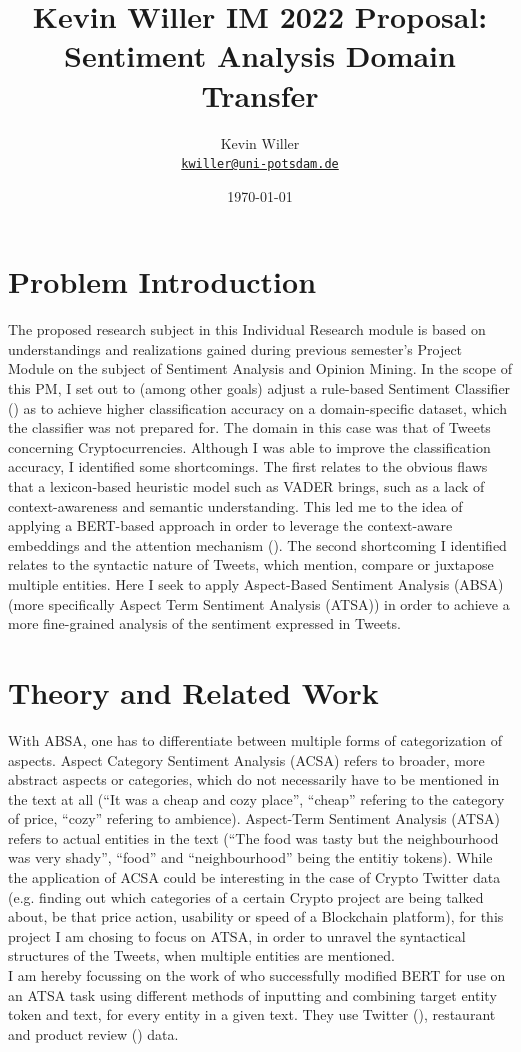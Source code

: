 \documentclass[11pt]{article}
\title{Kevin Willer IM 2022 Proposal: Sentiment Analysis Domain Transfer}
\author{Kevin Willer\\%
    \href{mailto:kwiller@uni-potsdam.de}{\texttt{kwiller@uni-potsdam.de}} %
    }
\date{\today}
\begin{document}
\maketitle

\section{Problem Introduction}
The proposed research subject in this Individual Research module is based on understandings and realizations gained during previous semester's Project Module on the subject of Sentiment Analysis and Opinion Mining. In the scope of this PM, I set out to (among other goals) adjust a rule-based Sentiment Classifier (\cite{vader}) as to achieve higher classification accuracy on a domain-specific dataset, which the classifier was not prepared for. The domain in this case was that of Tweets concerning Cryptocurrencies. Although I was able to improve the classification accuracy, I identified some shortcomings. The first relates to the obvious flaws that a lexicon-based heuristic model such as VADER brings, such as a lack of context-awareness and semantic understanding. This led me to the idea of applying a BERT-based approach in order to leverage the context-aware embeddings and the attention mechanism (\cite{bert}).
The second shortcoming I identified relates to the syntactic nature of Tweets, which mention, compare or juxtapose multiple entities. Here I seek to apply Aspect-Based Sentiment Analysis (ABSA) (more specifically Aspect Term Sentiment Analysis (ATSA)) in order to achieve a more fine-grained analysis of the sentiment expressed in Tweets.

\section{Theory and Related Work}
With ABSA, one has to differentiate between multiple forms of categorization of aspects. Aspect Category Sentiment Analysis (ACSA) refers to broader, more abstract aspects or categories, which do not necessarily have to be mentioned in the text at all (``It was a cheap and cozy place'', ``cheap'' refering to the category of price, ``cozy'' refering to ambience). Aspect-Term Sentiment Analysis (ATSA) refers to actual entities in the text (``The food was tasty but the neighbourhood was very shady'', ``food'' and ``neighbourhood'' being the entitiy tokens). While the application of ACSA could be interesting in the case of Crypto Twitter data (e.g. finding out which categories of a certain Crypto project are being talked about, be that price action, usability or speed of a Blockchain platform), for this project I am chosing to focus on ATSA, in order to unravel the syntactical structures of the Tweets, when multiple entities are mentioned. \\
I am hereby focussing on the work of \cite{TD-BERT} who successfully modified BERT for use on an ATSA task using different methods of inputting and combining target entity token and text, for every entity in a given text. They use Twitter (\cite{twitter_data}), restaurant and product review (\cite{semeval2016}) data. \\
\end{document}
